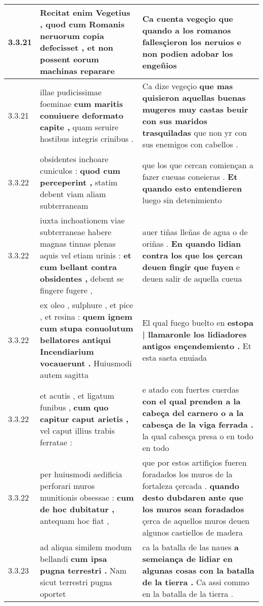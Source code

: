 \begin{tabular}{|p{1cm}|p{6.5cm}|p{6.5cm}|}
3.3.21 & Recitat enim Vegetius , \textbf{ quod cum Romanis neruorum copia defecisset , } et non possent eorum machinas reparare & Ca cuenta vegeçio \textbf{ que quando a los romanos fallesçieron los neruios } e non podien adobar los engeñios \\\hline
3.3.21 & illae pudicissimae foeminae \textbf{ cum maritis conuiuere deformato capite , } quam seruire hostibus integris crinibus . & Ca dize vegeçio \textbf{ que mas quisieron aquellas buenas mugeres muy castas beuir con sus maridos trasquiladas } que non yr con sus enemigos con cabellos . \\\hline
3.3.22 & obsidentes inchoare cuniculos : \textbf{ quod cum perceperint , } statim debent viam aliam subterraneam & que los que cercan comiençan a fazer cueuas coneieras . \textbf{ Et quando esto entendieren } luego sin detenimiento \\\hline
3.3.22 & iuxta inchoationem viae subterraneae habere magnas tinnas plenas aquis vel etiam urinis : \textbf{ et cum bellant contra obsidentes , } debent se fingere fugere , & auer tiñas lleñas de agua o de oriñas . \textbf{ En quando lidian contra los que los çercan deuen fingir que fuyen } e deuen salir de aquella cueua \\\hline
3.3.22 & ex oleo , sulphure , et pice , et resina : \textbf{ quem ignem cum stupa conuolutum bellatores antiqui Incendiarium vocauerunt . } Huiusmodi autem sagitta & El qual fuego buelto en \textbf{ estopa | llamaronle los lidiadores antigos ençendemiento . } Et esta saeta enuiada \\\hline
3.3.22 & et acutis , et ligatum funibus , \textbf{ cum quo capitur caput arietis , } vel caput illius trabis ferratae : & e atado con fuertes cuerdas \textbf{ con el qual prenden a la cabeça del carnero o a la cabesça de la viga ferrada . } la qual cabesça presa o en todo en todo \\\hline
3.3.22 & per huiusmodi aedificia perforari muros munitionis obsessae : \textbf{ cum de hoc dubitatur , } antequam hoc fiat , & que por estos artifiçios fueren foradados los muros de la fortaleza çercada . \textbf{ quando desto dubdaren ante que los muros sean foradados } çerca de aquellos muros deuen algunos castiellos de madera \\\hline
3.3.23 & ad aliqua similem modum bellandi \textbf{ cum ipsa pugna terrestri . } Nam sicut terrestri pugna oportet & ca la batalla de las naues \textbf{ a semeiança de lidiar en algunas cosas con la batalla de la tierra . } Ca assi commo en la batalla de la tierra . \\\hline

\end{tabular}
